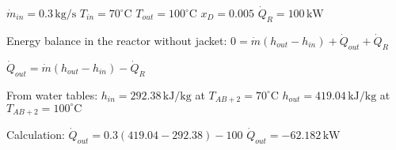 \( \dot{m}_{in} = 0.3 \, \text{kg/s} \)  
\( T_{in} = 70^\circ \text{C} \)  
\( T_{out} = 100^\circ \text{C} \)  
\( x_D = 0.005 \)  
\( \dot{Q}_R = 100 \, \text{kW} \)  

Energy balance in the reactor without jacket:  
\( 0 = \dot{m} (h_{out} - h_{in}) + \dot{Q}_{out} + \dot{Q}_R \)  

\( \dot{Q}_{out} = \dot{m} (h_{out} - h_{in}) - \dot{Q}_R \)  

From water tables:  
\( h_{in} = 292.38 \, \text{kJ/kg} \) at \( T_{AB + 2} = 70^\circ \text{C} \)  
\( h_{out} = 419.04 \, \text{kJ/kg} \) at \( T_{AB + 2} = 100^\circ \text{C} \)  

Calculation:  
\( \dot{Q}_{out} = 0.3 (419.04 - 292.38) - 100 \)  
\( \dot{Q}_{out} = -62.182 \, \text{kW} \)